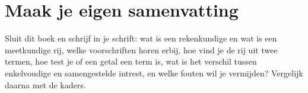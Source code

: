 
\ifzelfstudie
\section*{Maak je eigen samenvatting}
Sluit dit boek en schrijf in je schrift: wat is een rekenkundige en wat is een meetkundige rij, welke voorschriften horen erbij, hoe vind je de rij uit twee termen, hoe test je of een getal een term is, wat is het verschil tussen enkelvoudige en samengestelde intrest, en welke fouten wil je vermijden? Vergelijk daarna met de kaders.
\fi
